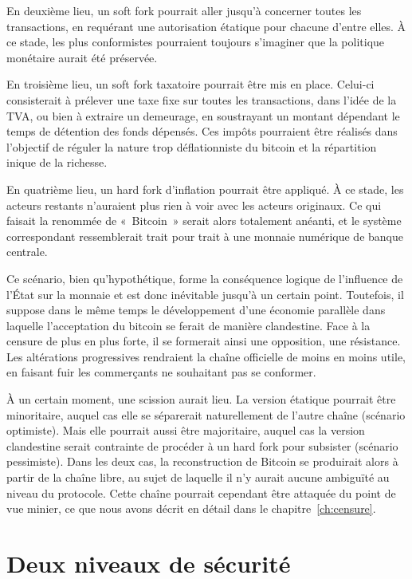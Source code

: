 En deuxième lieu, un soft fork pourrait aller jusqu'à concerner toutes les transactions, en requérant une autorisation étatique pour chacune d'entre elles. À ce stade, les plus conformistes pourraient toujours s'imaginer que la politique monétaire aurait été préservée.

En troisième lieu, un soft fork taxatoire pourrait être mis en place. Celui-ci consisterait à prélever une taxe fixe sur toutes les transactions, dans l'idée de la TVA, ou bien à extraire un demeurage, en soustrayant un montant dépendant le temps de détention des fonds dépensés. Ces impôts pourraient être réalisés dans l'objectif de réguler la nature trop déflationniste du bitcoin et la répartition inique de la richesse.

En quatrième lieu, un hard fork d'inflation pourrait être appliqué. À ce stade, les acteurs restants n'auraient plus rien à voir avec les acteurs originaux. Ce qui faisait la renommée de «~Bitcoin~» serait alors totalement anéanti, et le système correspondant ressemblerait trait pour trait à une monnaie numérique de banque centrale.

Ce scénario, bien qu'hypothétique, forme la conséquence logique de l'influence de l'État sur la monnaie et est donc inévitable jusqu'à un certain point. Toutefois, il suppose dans le même temps le développement d'une économie parallèle dans laquelle l'acceptation du bitcoin se ferait de manière clandestine. Face à la censure de plus en plus forte, il se formerait ainsi une opposition, une résistance. Les altérations progressives rendraient la chaîne officielle de moins en moins utile, en faisant fuir les commerçants ne souhaitant pas se conformer.

À un certain moment, une scission aurait lieu. La version étatique pourrait être minoritaire, auquel cas elle se séparerait naturellement de l'autre chaîne (scénario optimiste). Mais elle pourrait aussi être majoritaire, auquel cas la version clandestine serait contrainte de procéder à un hard fork pour subsister (scénario pessimiste). Dans les deux cas, la reconstruction de Bitcoin se produirait alors à partir de la chaîne libre, au sujet de laquelle il n'y aurait aucune ambiguïté au niveau du protocole. Cette chaîne pourrait cependant être attaquée du point de vue minier, ce que nous avons décrit en détail dans le chapitre~\ref{ch:censure}.

\section*{Deux niveaux de sécurité}

